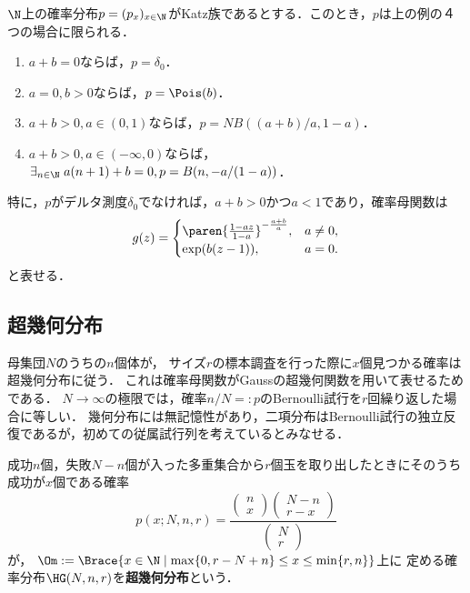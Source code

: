 \documentclass[uplatex,dvipdfmx]{jsreport}
\begin{document}
\begin{proposition}[実際の母数はかなり狭い]
    $\N$上の確率分布$p=(p_x)_{x\in\N}$がKatz族であるとする．このとき，$p$は上の例の４つの場合に限られる．
    \begin{enumerate}
        \item $a+b=0$ならば，$p=\delta_0$．
        \item $a=0,b>0$ならば，$p=\Pois(b)$．
        \item $a+b>0,a\in(0,1)$ならば，$p=NB((a+b)/a,1-a)$．
        \item $a+b>0,a\in(-\infty,0)$ならば，$\exists_{n\in\N}\;a(n+1)+b=0,p=B(n,-a/(1-a))$．
    \end{enumerate}
    特に，$p$がデルタ測度$\delta_0$でなければ，$a+b>0$かつ$a<1$であり，確率母関数は
    \[g(z)=\begin{cases}
        \paren{\frac{1-az}{1-a}}^{-\frac{a+b}{a}},&a\ne 0,\\
        \exp(b(z-1)),&a=0.
    \end{cases}\]
    と表せる．
\end{proposition}

\subsection{超幾何分布}

\begin{tcolorbox}[colframe=ForestGreen, colback=ForestGreen!10!white,breakable,colbacktitle=ForestGreen!40!white,coltitle=black,fonttitle=\bfseries\sffamily,
title=]
    母集団$N$のうちの$n$個体が，
    サイズ$r$の標本調査を行った際に$x$個見つかる確率は超幾何分布に従う．
    これは確率母関数がGaussの超幾何関数を用いて表せるためである．
    $N\to\infty$の極限では，確率$n/N=:p$のBernoulli試行を$r$回繰り返した場合に等しい．
    幾何分布には無記憶性があり，二項分布はBernoulli試行の独立反復であるが，初めての従属試行列を考えているとみなせる．
\end{tcolorbox}

\begin{definition}
    成功$n$個，失敗$N-n$個が入った多重集合から$r$個玉を取り出したときにそのうち成功が$x$個である確率
    \[p(x;N,n,r)=\frac{\begin{pmatrix}n\\x\end{pmatrix}\begin{pmatrix}N-n\\r-x\end{pmatrix}}{\begin{pmatrix}N\\r\end{pmatrix}}\]
    が，
    $\Om:=\Brace{x\in\N\mid\max\{0,r-N+n\}\le x\le\min\{r,n\}}$上に
    定める確率分布$\HG(N,n,r)$を\textbf{超幾何分布}という．
\end{definition}
\end{document}
